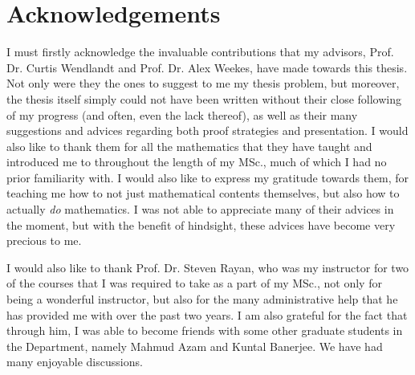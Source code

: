 \section*{Acknowledgements}
    I must firstly acknowledge the invaluable contributions that my advisors, Prof. Dr. Curtis Wendlandt and Prof. Dr. Alex Weekes, have made towards this thesis. Not only were they the ones to suggest to me my thesis problem, but moreover, the thesis itself simply could not have been written without their close following of my progress (and often, even the lack thereof), as well as their many suggestions and advices regarding both proof strategies and presentation. I would also like to thank them for all the mathematics that they have taught and introduced me to throughout the length of my MSc., much of which I had no prior familiarity with. I would also like to express my gratitude towards them, for teaching me how to not just mathematical contents themselves, but also how to actually \textit{do} mathematics. I was not able to appreciate many of their advices in the moment, but with the benefit of hindsight, these advices have become very precious to me.
    
    I would also like to thank Prof. Dr. Steven Rayan, who was my instructor for two of the courses that I was required to take as a part of my MSc., not only for being a wonderful instructor, but also for the many administrative help that he has provided me with over the past two years. I am also grateful for the fact that through him, I was able to become friends with some other graduate students in the Department, namely Mahmud Azam and Kuntal Banerjee. We have had many enjoyable discussions.